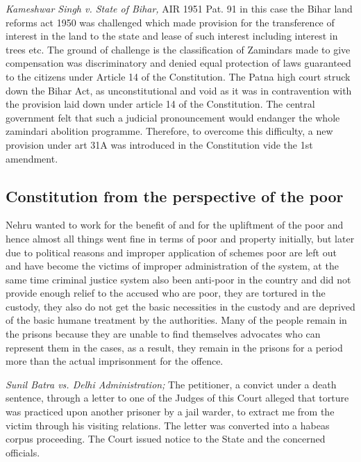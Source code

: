 \begin{multicols}{2}
\noi
\textit{Kameshwar Singh v. State of Bihar,} AIR 1951 Pat. 91 in this case the Bihar land reforms act 1950 was challenged which made provision for the transference of interest in the land to the state and lease of such interest including interest in trees etc. The ground of challenge is the classification of Zamindars made to give compensation was discriminatory and denied equal protection of laws guaranteed to the citizens under Article 14 of the Constitution. The Patna high court struck down the Bihar Act, as unconstitutional and void as it was in contravention with the provision laid down under article 14 of the Constitution. The central government felt that such a judicial pronouncement would endanger the whole zamindari abolition programme. Therefore, to overcome this difficulty, a new provision under art 31A was introduced in the Constitution vide the 1st amendment.

\subsection*{Constitution from the perspective of the poor}

\noi
Nehru wanted to work for the benefit of and for the upliftment of the poor and hence almost all things went fine in terms of poor and property initially, but later due to political reasons and improper application of schemes poor are left out and have become the victims of improper administration of the system, at the same time criminal justice system also been anti-poor in the country and did not provide enough relief to the accused who are poor, they are tortured in the custody, they also do not get the basic necessities in the custody and are deprived of the basic humane treatment by the authorities. Many of the people remain in the prisons because they are unable to find themselves advocates who can represent them in the cases, as a result, they remain in the prisons for a period more than the actual imprisonment for the offence.

\noi
\textit{Sunil Batra vs. Delhi Administration;} The petitioner, a convict under a death sentence, through a letter to one of the Judges of this Court alleged that torture was practiced upon another prisoner by a jail warder, to extract me from the victim through his visiting relations. The letter was converted into a habeas corpus proceeding. The Court issued notice to the State and the concerned officials.


\end{multicols}
